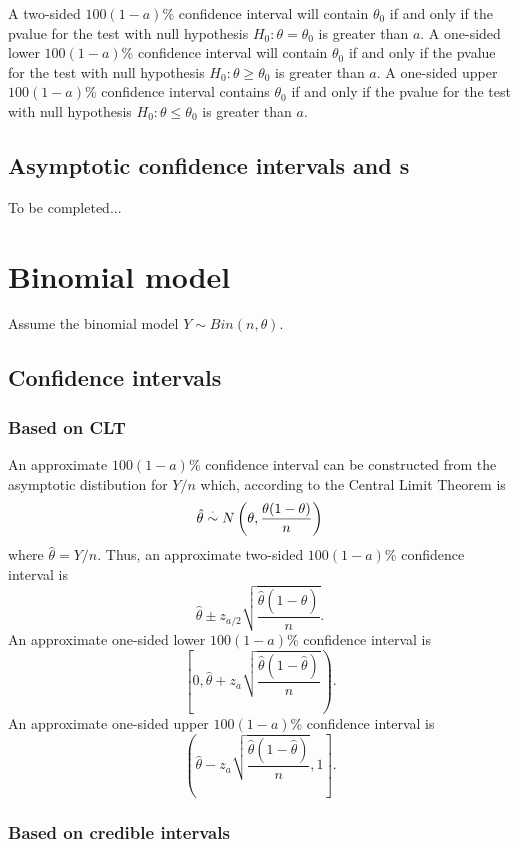 A two-sided $100(1-a)$\% confidence interval will contain $\theta_0$ 
if and only if the pvalue for the test with null hypothesis 
$H_0:\theta=\theta_0$ is greater than $a$.
A one-sided lower $100(1-a)$\% confidence interval will contain $\theta_0$
if and only if the pvalue for the test with null hypothesis 
$H_0:\theta\ge\theta_0$ is greater than $a$.
A one-sided upper $100(1-a)$\% confidence interval contains $\theta_0$
if and only if the pvalue for the test with null hypothesis 
$H_0:\theta\le\theta_0$ is greater than $a$.



\subsection{Asymptotic confidence intervals and \pvalue{}s}

To be completed...

\section{Binomial model}

Assume the binomial model $Y\sim Bin(n,\theta)$. 

\subsection{Confidence intervals}


\subsubsection{Based on CLT}

An approximate $100(1-a)$\% confidence interval can be constructed from the 
asymptotic distibution for $Y/n$ which, according to the Central Limit Theorem
is 
\[
\hat\theta \stackrel{\cdot}{\sim} N\left(\theta, \frac{\theta(1-\theta)}{n} \right)
\]
where $\hat\theta = Y/n$.
Thus, an approximate two-sided $100(1-a)$\% confidence interval is
\[ 
\hat\theta \pm z_{a/2} \sqrt{\frac{\hat\theta(1-\hat\theta)}{n}}.
\]
An approximate one-sided lower $100(1-a)$\% confidence interval is
\[
\left[0,\hat\theta + z_{a} \sqrt{\frac{\hat\theta(1-\hat\theta)}{n}}\right).
\]
An approximate one-sided upper $100(1-a)$\% confidence interval is
\[
\left(\hat\theta - z_{a} \sqrt{\frac{\hat\theta(1-\hat\theta)}{n}},1\right].
\]

\subsubsection{Based on credible intervals}

